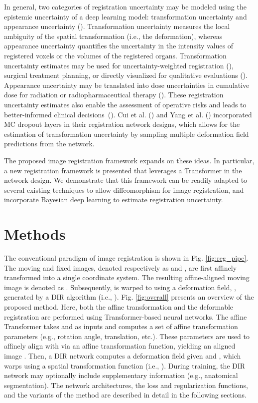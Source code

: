 \documentclass[times,twocolumn,final]{elsarticle}
\begin{document}
In general, two categories of registration uncertainty may be modeled using the epistemic uncertainty of a deep learning model: transformation uncertainty and appearance uncertainty (\cite{luo2019applicability, xu2021double}). Transformation uncertainty measures the local ambiguity of the spatial transformation (i.e., the deformation), whereas appearance uncertainty quantifies the uncertainty in the intensity values of registered voxels or the volumes of the registered organs. Transformation uncertainty estimates may be used for uncertainty-weighted registration (\cite{simpson2011longitudinal, kybic2009bootstrap}), surgical treatment planning, or directly visualized for qualitative evaluations (\cite{yang2017quicksilver}). Appearance uncertainty may be translated into dose uncertainties in cumulative dose for radiation or radiopharmaceutical therapy (\cite{risholm2011estimation, vickress2017representing, chetty2019deformable, gear2018eanm}). These registration uncertainty estimates also enable the assessment of operative risks and leads to better-informed clinical decisions~(\cite{luo2019applicability}). Cui et al. (\cite{cui2021bayesian}) and Yang et al. (\cite{yang2017quicksilver}) incorporated MC dropout layers in their registration network designs, which allows for the estimation of transformation uncertainty by sampling multiple deformation field predictions from the network.

The proposed image registration framework expands on these ideas. In particular, a new registration framework is presented that leverages a Transformer in the network design. We demonstrate that this framework can be readily adapted to several existing techniques to allow diffeomorphism for image registration, and incorporate Bayesian deep learning to estimate registration uncertainty. 
\section{Methods}
\label{sec:methods}
The conventional paradigm of image registration is shown in Fig. \ref{fig:reg_pipe}. The moving and fixed images, denoted respectively as  and , are first affinely transformed into a single coordinate system. The resulting affine-aligned moving image is denoted as . Subsequently,  is warped to  using a deformation field, , generated by a DIR algorithm (i.e., ). Fig. \ref{fig:overall} presents an overview of the proposed method. Here, both the affine transformation and the deformable registration are performed using Transformer-based neural networks. The affine Transformer takes  and  as inputs and computes a set of affine transformation parameters (e.g., rotation angle, translation, etc.). These parameters are used to affinely align  with  via an affine transformation function, yielding an aligned image . Then, a DIR network computes a deformation field  given  and , which warps  using a spatial transformation function (i.e., ). During training, the DIR network may optionally include supplementary information (e.g., anatomical segmentation). The network architectures, the loss and regularization functions, and the variants of the method are described in detail in the following sections.
\end{document}
